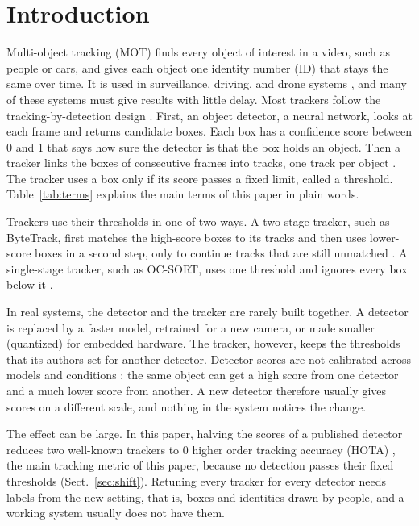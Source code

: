 \documentclass[pdflatex,sn-mathphys-num,iicol]{sn-jnl}
\begin{document}
\maketitle

\section{Introduction}\label{sec:intro}

Multi-object tracking (MOT) finds every object of interest in a video, such as
people or cars, and gives each object one identity number (ID) that stays the
same over time. It is used in surveillance, driving, and drone systems
\cite{zhu2022visdrone,wu2022uavsurvey}, and many of these systems must give
results with little delay. Most trackers follow the tracking-by-detection
design \cite{adzemovic2026survey}. First, an object detector, a neural network,
looks at each frame and returns candidate boxes. Each box has a confidence
score between 0 and 1 that says how sure the detector is that the box holds an
object. Then a tracker links the boxes of consecutive frames into tracks, one
track per object \cite{bewley2016sort,zhang2022bytetrack,cao2023ocsort}. The
tracker uses a box only if its score passes a fixed limit, called a threshold.
Table~\ref{tab:terms} explains the main terms of this paper in plain words.

Trackers use their thresholds in one of two ways. A two-stage tracker, such as
ByteTrack, first matches the high-score boxes to its tracks and then uses
lower-score boxes in a second step, only to continue tracks that are still
unmatched \cite{zhang2022bytetrack}. A single-stage tracker, such as OC-SORT,
uses one threshold and ignores every box below it \cite{cao2023ocsort}.

In real systems, the detector and the tracker are rarely built together. A
detector is replaced by a faster model, retrained for a new camera, or made
smaller (quantized) for embedded hardware. The tracker, however, keeps the
thresholds that its authors set for another detector. Detector scores are not
calibrated across models and conditions \cite{kuppers2020detcalib}: the same
object can get a high score from one detector and a much lower score from
another. A new detector therefore usually gives scores on a different scale,
and nothing in the system notices the change.

The effect can be large. In this paper, halving the scores of a published
detector reduces two well-known trackers to 0 higher order tracking accuracy
(HOTA) \cite{luiten2021hota}, the main tracking metric of this paper, because
no detection passes their fixed thresholds (Sect.~\ref{sec:shift}). Retuning
every tracker for every detector needs labels from the new setting, that is,
boxes and identities drawn by people, and a working system usually does not
have them.
\end{document}
